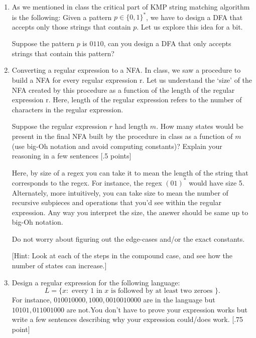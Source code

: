 \documentclass[11pt]{article}
\begin{document}
\begin{enumerate}


\item As we mentioned in class the critical part of KMP string matching algorithm is the following: Given a pattern $p \in \{0,1\}^*$, we have to design a DFA that accepts only those strings that contain $p$. Let us explore this idea for a bit.

Suppose the pattern $p$ is $0110$, can you design a DFA that only accepts strings that contain this pattern? 


\item Converting a regular expression to a NFA. In class, we saw a procedure to build a NFA for every regular expression r. Let us understand the `size' of the NFA created by this procedure as a function of the length of the regular expression r. Here, length of the regular expression refers to the number of characters in the regular expression. 

Suppose the regular expression $r$ had length $m$. How many states would be present in the final NFA built by the procedure in class as a function of $m$ (use big-Oh notation and avoid computing constants)? Explain your reasoning in a few sentences [.5 points]

Here, by size of a regex you can take it to mean the length of the string that corresponds to the regex. For instance, the regex $(01)^*$ would have size 5. Alternately, more intuitively, you can take size to mean the number of recursive subpieces and operations that you'd see within the regular expression. Any way you interpret the size, the answer should be same up to big-Oh notation. 

Do not worry about figuring out the edge-cases and/or the exact constants.

[Hint: Look at each of the steps in the compound case, and see how the number of states can increase.]

\item Design a regular expression for the following language: 
$$L = \{x: \text{ every $1$ in $x$ is followed by at least two zeroes }\}.$$
For instance, $010010000,1000,0010010000$ are in the language but $10101, 011001000$ are not.You don't have to prove your expression works but write a few sentences describing why your expression could/does work. [.75 point]


\end{enumerate}
\end{document}
